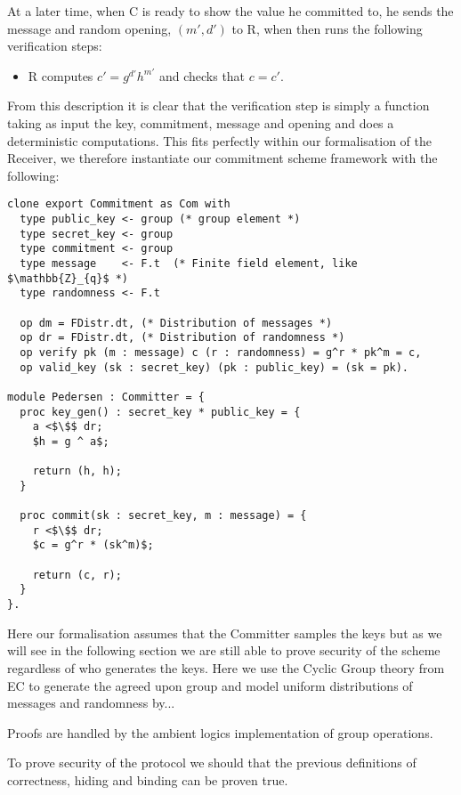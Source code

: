At a later time, when C is ready to show the value he committed to, he sends the
message and random opening, $(m',d')$ to R, when then runs the following
verification steps:
\begin{itemize}
  \item R computes $c' = g^{d'}h^{m'}$ and checks that $c = c'$.
\end{itemize}

From this description it is clear that the verification step is simply a
function taking as input the key, commitment, message and opening and does a
deterministic computations. This fits perfectly within our formalisation of the
Receiver, we therefore instantiate our commitment scheme framework with the
following:

\begin{lstlisting}[mathescape,label=lst:commitment:pedersen,caption=Pedersen instantiation]
clone export Commitment as Com with
  type public_key <- group (* group element *)
  type secret_key <- group
  type commitment <- group
  type message    <- F.t  (* Finite field element, like $\mathbb{Z}_{q}$ *)
  type randomness <- F.t

  op dm = FDistr.dt, (* Distribution of messages *)
  op dr = FDistr.dt, (* Distribution of randomness *)
  op verify pk (m : message) c (r : randomness) = g^r * pk^m = c,
  op valid_key (sk : secret_key) (pk : public_key) = (sk = pk).

module Pedersen : Committer = {
  proc key_gen() : secret_key * public_key = {
    a <$\$$ dr;
    $h = g ^ a$;

    return (h, h);
  }

  proc commit(sk : secret_key, m : message) = {
    r <$\$$ dr;
    $c = g^r * (sk^m)$;

    return (c, r);
  }
}.

\end{lstlisting}

Here our formalisation assumes that the Committer samples the keys but as we
will see in the following section we are still able to prove security of the
scheme regardless of who generates the keys.
Here we use the Cyclic Group theory from EC to generate the agreed upon group
and model uniform distributions of messages and randomness by...

Proofs are handled by the ambient logics implementation of group operations.

To prove security of the protocol we should that the previous definitions of
correctness, hiding and binding can be proven true.

